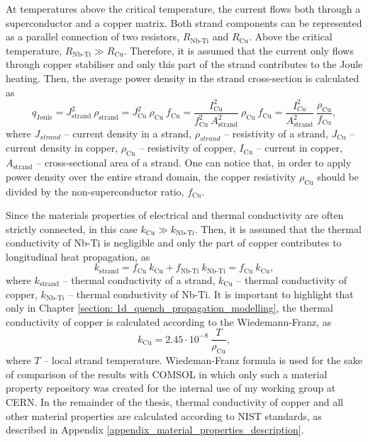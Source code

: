 At temperatures above the critical temperature, the current flows both through a superconductor and a copper matrix. Both strand components can be represented as a parallel connection of two resistors, $R_\text{Nb-Ti}$ and $R_\text{Cu}$. Above the critical temperature, $R_\text{Nb-Ti} \gg R_\text{Cu}$. Therefore, it is assumed that the current only flows through copper stabiliser and only this part of the strand contributes to the Joule heating. Then, the average power density in the strand cross-section is calculated as 
\begin{equation}
    q_\text{Joule} = J_\text{strand}^2~\rho_\text{strand} = J_\text{Cu}^2~\rho_\text{Cu}~f_\text{Cu} = \frac{I_\text{Cu}^2}{f_\text{Cu}^2~A_\text{strand}^2}~\rho_\text{Cu}~f_\text{Cu} = \frac{I_{Cu}^2}{A_\text{strand}^2}~\frac{\rho_\text{Cu}}{f_\text{Cu}}, 
    \label{eqn: p_dens_equiv}
\end{equation}
where $J_{strand}$ -- current density in a strand, $\rho_{strand}$ -- resistivity of a strand, $J_\text{Cu}$ -- current density in copper, $\rho_\text{Cu}$ -- resistivity of copper, $I_\text{Cu}$ -- current in copper, $A_\text{strand}$ -- cross-sectional area of a strand. One can notice that, in order to apply power density over the entire strand domain, the copper resistivity $\rho_\text{Cu}$ should be divided by the non-superconductor ratio, $f_\text{Cu}$.

Since the materials properties of electrical and thermal conductivity are often strictly connected, in this case $k_\text{Cu} \gg k_\text{Nb-Ti}$. Then, it is assumed that the thermal conductivity of Nb-Ti is negligible and only the part of copper contributes to longitudinal heat propagation, as 
\begin{equation}
    k_\text{strand} = f_\text{Cu} ~ k_\text{Cu} + f_\text{Nb-Ti} ~ k_\text{Nb-Ti} =  f_\text{Cu} ~ k_\text{Cu},
    \label{eqn: k_equiv}
\end{equation}
where $k_\text{strand}$ -- thermal conductivity of a strand, $k_\text{Cu}$ -- thermal conductivity of copper, $k_\text{Nb-Ti}$ -- thermal conductivity of Nb-Ti. It is important to highlight that only in Chapter \ref{section: 1d_quench_propagation_modelling}, the thermal conductivity of copper is calculated according to the Wiedemann-Franz, as
\begin{equation}
    k_\text{Cu} = 2.45 \cdot 10^{-8} ~ \frac{T}{\rho_\text{Cu}},
    \label{eqn: k_cu_wiedemann_franz}
\end{equation}
where $T$ -- local strand temperature. Wiedeman-Franz formula is used for the sake of comparison of the results with COMSOL in which only such a material property repository was created for the internal use of my working group at CERN. In the remainder of the thesis, thermal conductivity of copper and all other material properties are calculated according to NIST standards, as described in Appendix \ref{appendix_material_properties_description}. 

